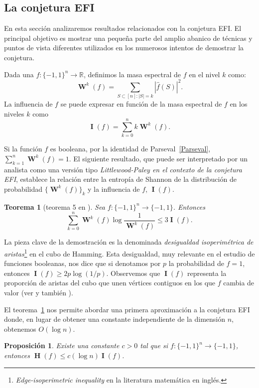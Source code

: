 \documentclass[autocontact]{gaceta}
\newcommand{\R}{\mathbb{R}}
\newtheorem{theorem}{Teorema}
\newtheorem{proposition}{Proposición}
\DeclareMathOperator{\II}{\mathbf{I}}
\DeclareMathOperator{\HH}{\mathbf{H}}
\DeclareMathOperator{\WW}{\mathbf{W}}
\begin{document}
\subsection{La conjetura EFI}

En esta sección analizaremos resultados relacionados con la conjetura EFI. El principal objetivo es mostrar una pequeña parte del amplio abanico de técnicas y puntos de vista diferentes utilizados en los numerosos intentos de demostrar la conjetura.

Dada una $f:\{-1,1\}^n \to \R$, definimos la masa espectral de $f$ en el nivel $k$ como:
\[
\WW^k(f)= \sum_{S\subset [n] \colon |S|=k} |\widehat{f}(S)|^2.
\]
La influencia de $f$ se puede expresar en función de la masa espectral de $f$ en los niveles $k$ como
\[
\II(f) = \sum_{k=0}^n k \WW^k(f).
\]

Si la función $f$ es booleana, por la identidad de Parseval~\eqref{Parseval}, $\sum_{k=1}^n\WW^k(f)=1$. El siguiente resultado, que puede ser interpretado por un analista como una versión tipo \emph{Littlewood-Paley en el contexto de la conjetura EFI}, establece la relación entre la entropía de Shannon de la distribución de probabilidad
$\{ \WW^k (f)\}_k$ y la influencia de $f$, $\II(f)$.

\begin{theorem}[teorema 5 en \cite{OWZ11}]\label{A}\label{thm:OWZ11-Theorem 5}
Sea $f: \{-1,1\}^n\to \{-1,1\}$. Entonces
\[
\sum_{k=0}^n \WW^k(f) \log \frac{1}{\WW^k(f)}\leq 3 \II(f).
\]
\end{theorem}

La pieza clave de la demostración es la denominada \emph{desigualdad isoperimétrica de aristas}\footnote{\emph{Edge-isoperimetric inequality} en la literatura matemática en inglés.} en el cubo de Hamming. Esta desigualdad, muy relevante en el estudio de funciones booleanas, nos dice que si denotamos por $p$ la probabilidad de $f=1$, entonces $\II(f)\geq 2p \log(1/p)$. Observemos que $\II(f)$ representa la proporción de aristas del cubo que unen vértices contiguos en los que $f$ cambia de valor (ver \cite[proposición~2]{OWZ11} y también \cite{FS07}).

El teorema~\ref{A} nos permite abordar una primera aproximación a la conjetura EFI donde, en lugar de obtener una constante independiente de la dimensión $n$, obtenemos $O(\log n)$.

\begin{proposition}\label{logn}
Existe una constante $c>0$ tal que si $f:\{-1,1\}^n\to\{-1,1\}$, entonces $\HH(f)\leq c (\log n) \II(f)$.
\end{proposition}
\end{document}
